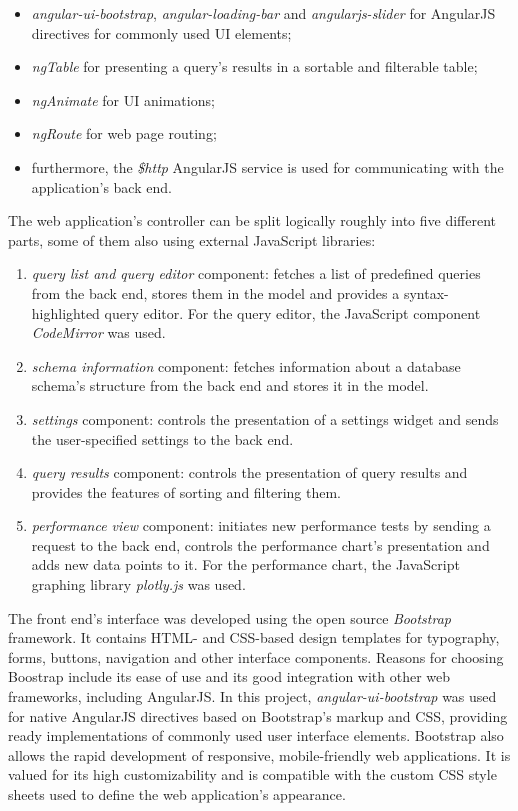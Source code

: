 \begin{itemize}
	\item \textit{angular-ui-bootstrap}, \textit{angular-loading-bar} and \textit{angularjs-slider} for AngularJS directives for commonly used UI elements;
	\item \textit{ngTable} for presenting a query's results in a sortable and filterable table;
	\item \textit{ngAnimate} for UI animations;
	\item \textit{ngRoute} for web page routing;
	\item furthermore, the \textit{\$http} AngularJS service is used for communicating with the application's back end.
\end{itemize}

The web application's controller can be split logically roughly into five different parts, some of them also using external JavaScript libraries:

\begin{enumerate}
	\item \textit{query list and query editor} component: fetches a list of predefined queries from the back end, stores them in the model and provides a syntax-highlighted query editor. For the query editor, the JavaScript component \textit{CodeMirror} was used. 
	\item \textit{schema information} component: fetches information about a database schema's structure from the back end and stores it in the model.
	\item \textit{settings} component: controls the presentation of a settings widget and sends the user-specified settings to the back end.
	\item \textit{query results} component: controls the presentation of query results and provides the features of sorting and filtering them.
	\item \textit{performance view} component: initiates new performance tests by sending a request to the back end, controls the performance chart's presentation and adds new data points to it. For the performance chart, the JavaScript graphing library \textit{plotly.js} was used. 
\end{enumerate}

The front end's interface was developed using the open source \textit{Bootstrap} framework. It contains HTML- and CSS-based design templates for typography, forms, buttons, navigation and other interface components. Reasons for choosing Boostrap include its ease of use and its good integration with other web frameworks, including AngularJS. In this project, \textit{angular-ui-bootstrap} was used for native AngularJS directives based on Bootstrap's markup and CSS, providing ready implementations of commonly used user interface elements. Bootstrap also allows the rapid development of responsive, mobile-friendly web applications. It is valued for its high customizability and is compatible with the custom CSS style sheets used to define the web application's appearance.
